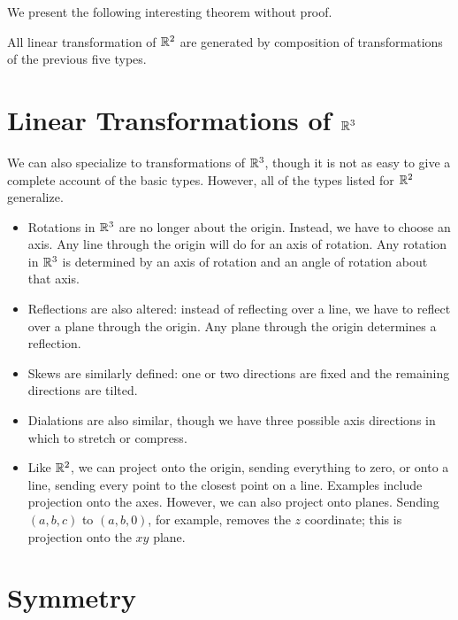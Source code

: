 \documentclass[fleqn]{report}
\begin{document}
We present the following interesting theorem without proof.
\begin{thm}
All linear transformation of $\mathbb{R}^2$ are generated by
composition of transformations of the previous five types.
\end{thm}

\section{Linear Transformations of $\mathbb{R}^3$}

We can also specialize to transformations of $\mathbb{R}^3$, though it
is not as easy to give a complete account of the basic types.
However, all of the types listed for $\mathbb{R}^2$ generalize.

\begin{itemize}
\item Rotations in $\mathbb{R}^3$ are no longer about the origin.
Instead, we have to choose an axis. Any line through the origin
will do for an axis of rotation. Any rotation in $\mathbb{R}^3$ is
determined by an axis of rotation and an angle of rotation about
that axis.
\item Reflections are also altered: instead of reflecting over a
line, we have to reflect over a plane through the origin. Any
plane through the origin determines a reflection.
\item Skews are similarly defined: one or two directions are
fixed and the remaining directions are tilted.
\item Dialations are also similar, though we have three possible
axis directions in which to stretch or compress.
\item Like $\mathbb{R}^2$, we can project onto the origin, sending
everything to zero, or onto a line, sending every point to the
closest point on a line. Examples include projection
onto the axes. However, we can also project onto planes.
Sending $(a,b,c)$ to $(a,b,0)$, for example, removes the $z$
coordinate; this is projection onto the $xy$ plane.
\end{itemize}

\section{Symmetry}
\end{document}
